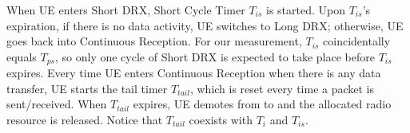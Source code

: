 When UE enters Short DRX, Short Cycle Timer $T_{is}$ is started. Upon $T_{is}$'s expiration, if there is no data activity, UE switches to Long DRX; otherwise, UE goes back into Continuous Reception. For our measurement, $T_{is}$ coincidentally equals $T_{ps}$, so only one cycle of Short DRX is expected to take place before $T_{is}$ expires. Every time UE enters Continuous Reception when there is any data transfer, UE starts the tail timer $T_{tail}$, which is reset every time a packet is sent/received. When $T_{tail}$ expires, UE demotes from \RC to \RI and the allocated radio resource is released. Notice that $T_{tail}$ coexists with $T_{i}$ and $T_{is}$.



